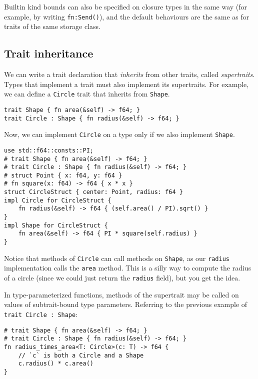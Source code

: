 \documentclass[]{article}
\begin{document}
Builtin kind bounds can also be specified on closure types in the same
way (for example, by writing \texttt{fn:Send()}), and the default
behaviours are the same as for traits of the same storage class.

\subsection{Trait inheritance}\label{trait-inheritance}

We can write a trait declaration that \emph{inherits} from other traits,
called \emph{supertraits}. Types that implement a trait must also
implement its supertraits. For example, we can define a \texttt{Circle}
trait that inherits from \texttt{Shape}.

\begin{verbatim}
trait Shape { fn area(&self) -> f64; }
trait Circle : Shape { fn radius(&self) -> f64; }
\end{verbatim}

Now, we can implement \texttt{Circle} on a type only if we also
implement \texttt{Shape}.

\begin{verbatim}
use std::f64::consts::PI;
# trait Shape { fn area(&self) -> f64; }
# trait Circle : Shape { fn radius(&self) -> f64; }
# struct Point { x: f64, y: f64 }
# fn square(x: f64) -> f64 { x * x }
struct CircleStruct { center: Point, radius: f64 }
impl Circle for CircleStruct {
    fn radius(&self) -> f64 { (self.area() / PI).sqrt() }
}
impl Shape for CircleStruct {
    fn area(&self) -> f64 { PI * square(self.radius) }
}
\end{verbatim}

Notice that methods of \texttt{Circle} can call methods on
\texttt{Shape}, as our \texttt{radius} implementation calls the
\texttt{area} method. This is a silly way to compute the radius of a
circle (since we could just return the \texttt{radius} field), but you
get the idea.

In type-parameterized functions, methods of the supertrait may be called
on values of subtrait-bound type parameters. Referring to the previous
example of \texttt{trait Circle : Shape}:

\begin{verbatim}
# trait Shape { fn area(&self) -> f64; }
# trait Circle : Shape { fn radius(&self) -> f64; }
fn radius_times_area<T: Circle>(c: T) -> f64 {
    // `c` is both a Circle and a Shape
    c.radius() * c.area()
}
\end{verbatim}
\end{document}
